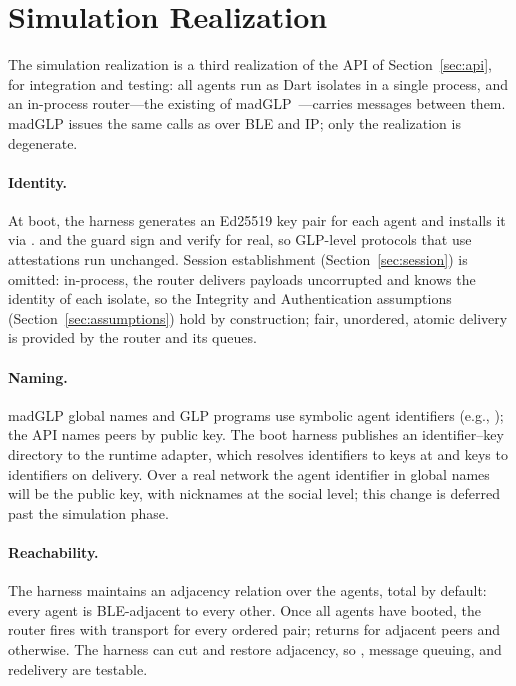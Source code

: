 \section{Simulation Realization}
\label{sec:simulation}
The simulation realization is a third realization of the API of Section~\ref{sec:api}, for integration and testing: all agents run as Dart isolates in a single process, and an in-process router---the existing  of madGLP~\cite{shapiro2026implementing}---carries messages between them.  madGLP issues the same calls as over BLE and IP; only the realization is degenerate.

\paragraph{Identity.}
At boot, the harness generates an Ed25519 key pair for each agent and installs it via .   and the guard  sign and verify for real, so GLP-level protocols that use attestations run unchanged.  Session establishment (Section~\ref{sec:session}) is omitted: in-process, the router delivers payloads uncorrupted and knows the identity of each isolate, so the Integrity and Authentication assumptions (Section~\ref{sec:assumptions}) hold by construction; fair, unordered, atomic delivery is provided by the router and its queues.

\paragraph{Naming.}
madGLP global names and GLP programs use symbolic agent identifiers (e.g., ); the API names peers by public key.  The boot harness publishes an identifier--key directory to the runtime adapter, which resolves identifiers to keys at  and keys to identifiers on delivery.  Over a real network the agent identifier in global names will be the public key, with nicknames at the social level; this change is deferred past the simulation phase.

\paragraph{Reachability.}
The harness maintains an adjacency relation over the agents, total by default: every agent is BLE-adjacent to every other.  Once all agents have booted, the router fires  with transport  for every ordered pair;  returns \code{[BLE]} for adjacent peers and \code{[]} otherwise.  The harness can cut and restore adjacency, so , message queuing, and redelivery are testable.


